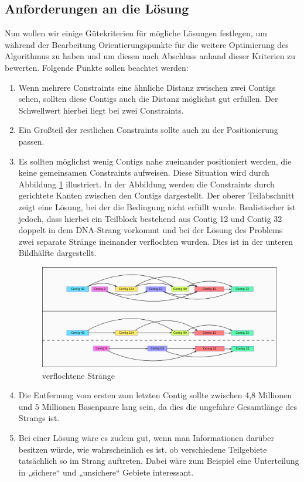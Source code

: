 \subsection{Anforderungen an die Lösung}
Nun wollen wir einige Gütekriterien für mögliche Lösungen festlegen, um während der Bearbeitung Orientierungspunkte für die weitere Optimierung des Algorithmus zu haben und um diesen nach Abschluss anhand dieser Kriterien zu bewerten.
Folgende Punkte sollen beachtet werden:
\begin{enumerate}
\item Wenn mehrere Constraints eine ähnliche Distanz zwischen zwei Contigs sehen, sollten diese Contigs auch die Distanz möglichst gut erfüllen. Der Schwellwert hierbei liegt bei zwei Constraints.
\item Ein Großteil der restlichen Constraints sollte auch zu der Positionierung passen.
\item Es sollten möglichst wenig Contigs nahe zueinander positioniert werden, die keine gemeinsamen Constraints aufweisen. Diese Situation wird durch Abbildung \ref{gespallten} illustriert. In der Abbildung werden die Constraints durch gerichtete Kanten zwischen den Contigs dargestellt. Der oberer Teilabschnitt zeigt eine Lösung, bei der die Bedingung nicht erfüllt wurde. Realistischer ist jedoch, dass hierbei ein Teilblock bestehend aus Contig 12 und Contig 32 doppelt in dem DNA-Strang vorkommt und bei der Lösung des Problems zwei separate Stränge ineinander verflochten wurden. Dies ist in der unteren Bildhälfte dargestellt.

\begin{figure}
	\begin{center}
		\includegraphics[width=1\textwidth]{bilder/gespallten}
	\end{center}
	\caption{verflochtene Stränge}
	\label{gespallten}
\end{figure}
	
\item Die Entfernung vom ersten zum letzten Contig sollte zwischen 4,8 Millionen und 5 Millionen Basenpaare lang sein, da dies die ungefähre Gesamtlänge des Strangs ist.
\item Bei einer Lösung wäre es zudem gut, wenn man Informationen darüber besitzen würde, wie wahrscheinlich es ist, ob verschiedene Teilgebiete tatsächlich so im Strang auftreten. Dabei wäre zum Beispiel eine Unterteilung in „sichere“ und „unsichere“ Gebiete interessant.
\end{enumerate}

